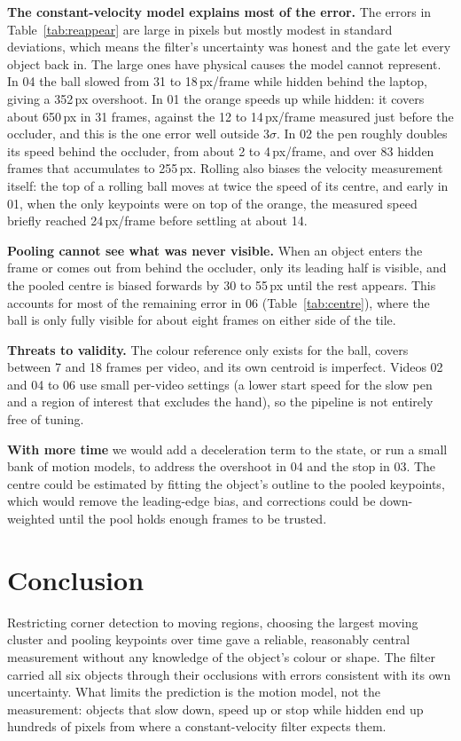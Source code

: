 \documentclass[conference]{assets/latex/IEEEtran}
\begin{document}
\textbf{The constant-velocity model explains most of the error.} The errors in Table~\ref{tab:reappear} are large in pixels but mostly modest in standard deviations, which means the filter's uncertainty was honest and the gate let every object back in. The large ones have physical causes the model cannot represent. In 04 the ball slowed from 31 to 18\,px/frame while hidden behind the laptop, giving a 352\,px overshoot. In 01 the orange speeds up while hidden: it covers about 650\,px in 31 frames, against the 12 to 14\,px/frame measured just before the occluder, and this is the one error well outside 3$\sigma$. In 02 the pen roughly doubles its speed behind the occluder, from about 2 to 4\,px/frame, and over 83 hidden frames that accumulates to 255\,px. Rolling also biases the velocity measurement itself: the top of a rolling ball moves at twice the speed of its centre, and early in 01, when the only keypoints were on top of the orange, the measured speed briefly reached 24\,px/frame before settling at about 14.

\textbf{Pooling cannot see what was never visible.} When an object enters the frame or comes out from behind the occluder, only its leading half is visible, and the pooled centre is biased forwards by 30 to 55\,px until the rest appears. This accounts for most of the remaining error in 06 (Table~\ref{tab:centre}), where the ball is only fully visible for about eight frames on either side of the tile.

\textbf{Threats to validity.} The colour reference only exists for the ball, covers between 7 and 18 frames per video, and its own centroid is imperfect. Videos 02 and 04 to 06 use small per-video settings (a lower start speed for the slow pen and a region of interest that excludes the hand), so the pipeline is not entirely free of tuning.

\textbf{With more time} we would add a deceleration term to the state, or run a small bank of motion models, to address the overshoot in 04 and the stop in 03. The centre could be estimated by fitting the object's outline to the pooled keypoints, which would remove the leading-edge bias, and corrections could be down-weighted until the pool holds enough frames to be trusted.

\section{Conclusion}

Restricting corner detection to moving regions, choosing the largest moving cluster and pooling keypoints over time gave a reliable, reasonably central measurement without any knowledge of the object's colour or shape. The filter carried all six objects through their occlusions with errors consistent with its own uncertainty. What limits the prediction is the motion model, not the measurement: objects that slow down, speed up or stop while hidden end up hundreds of pixels from where a constant-velocity filter expects them.

\printbibliography
\end{document}
